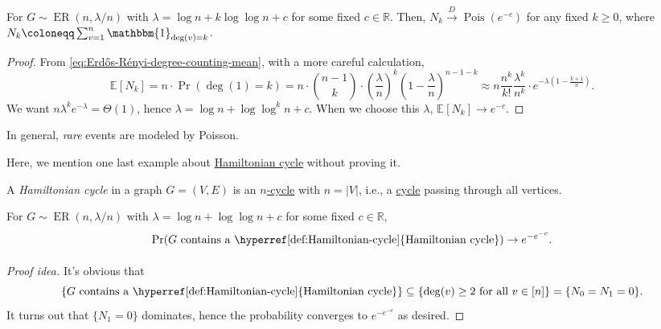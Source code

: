 \begin{theorem}
	For \(G \sim \operatorname{ER}(n, \lambda / n) \) with \(\lambda = \log n + k \log \log n + c\) for some fixed \(c \in \mathbb{R} \). Then, \(N_k \overset{D}{\to} \operatorname{Pois}(e^{-c}) \) for any fixed \(k \geq 0\), where \(N_k \coloneqq \sum_{v=1}^{n} \mathbbm{1}_{\deg (v) = k} \).
\end{theorem}
\begin{proof}
	From \autoref{eq:Erdős-Rényi-degree-counting-mean}, with a more careful calculation,
	\[
		\mathbb{E}_{}[N_k]
		= n \cdot \Pr_{}(\deg (1) = k)
		= n \cdot \binom{n-1}{k} \cdot \left( \frac{\lambda}{n} \right) ^k \left( 1 - \frac{\lambda}{n} \right) ^{n-1-k}
		\approx n \frac{n^k}{k!} \frac{\lambda ^k}{n^k} \cdot e^{-\lambda (1 - \frac{k+1}{n})}.
	\]
	We want \(n \lambda ^k e^{-\lambda } = \Theta (1)\), hence \(\lambda = \log n + \log \log^k n + c\). When we choose this \(\lambda \), \(\mathbb{E}_{}[N_k] \to e^{-c}\).
\end{proof}

\begin{remark}
	In general, \emph{rare} events are modeled by Poisson.
\end{remark}

Here, we mention one last example about \hyperref[def:Hamiltonian-cycle]{Hamiltonian cycle} without proving it.

\begin{definition}\label{def:Hamiltonian-cycle}
	A \emph{Hamiltonian cycle} in a graph \(G = (V, E)\) is an \hyperref[def:cycle]{\(n\)-cycle} with \(n = \lvert V \rvert \), i.e., a \hyperref[def:cycle]{cycle} passing through all vertices.
\end{definition}

\begin{theorem}
	For \(G \sim \operatorname{ER}(n, \lambda / n) \) with \(\lambda = \log n + \log \log n + c\) for some fixed \(c \in \mathbb{R} \),
	\[
		\Pr_{}(G\text{ contains a \hyperref[def:Hamiltonian-cycle]{Hamiltonian cycle}} )
		\to e^{-e^{-c}}.
	\]
\end{theorem}
\begin{proof}[Proof idea]
	It's obvious that
	\[
		\{G \text{ contains a \hyperref[def:Hamiltonian-cycle]{Hamiltonian cycle}} \}
		\subseteq \{ \deg (v) \geq 2 \text{ for all } v \in [n] \}
		= \{ N_0 = N_1 = 0\}.
	\]
	It turns out that \(\{ N_1 = 0 \} \) dominates, hence the probability converges to \(e^{-e^{-c}}\) as desired.
\end{proof}

